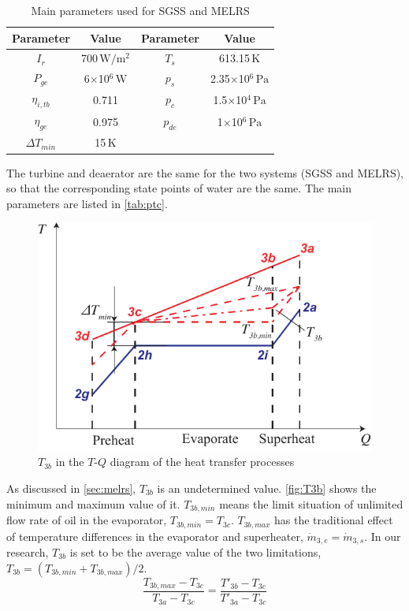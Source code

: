 \begin{table}[htbp]
	\caption{Main parameters used for SGSS and MELRS}
	\centering
	\begin{tabular}{cccc}
		\toprule
		Parameter		&	Value	&	Parameter		&	Value\\
		\midrule
		$I_r$	&	700$\,\mathrm{W/m^2}$	&	$T_s$		&	613.15$\,\mathrm{K}$\\
		$P_{ge}$	&	6$\times$10$^6\,\mathrm{W}$	&	$p_s$		&	2.35$\times$10$^6\,\mathrm{Pa}$\\
		$\eta_{i,tb}$	&	0.711	&	$p_c$		&	1.5$\times$10$^4\,\mathrm{Pa}$\\
		$\eta_{ge}$	&	0.975	&	$p_{de}$		&	1$\times$10$^6\,\mathrm{Pa}$\\
		$\Delta T_{min}$	&	15$\,\mathrm{K}$	&	&\\		
		\bottomrule
	\end{tabular}
	\label{tab:ptc}
\end{table}

The turbine and deaerator are the same for the two systems (SGSS and MELRS), so that the corresponding state points of water are the same. The main parameters are listed in \autoref{tab:ptc}.

\begin{figure}[htbp]
\centering
	\includegraphics[width = 0.7\columnwidth]{fig/T3b}
	\caption{$T_{3b}$ in the $T$-$Q$ diagram of the heat transfer processes}
	\label{fig:T3b}
\end{figure}

As discussed in \autoref{sec:melrs}, $T_{3b}$ is an undetermined value. \autoref{fig:T3b} shows the minimum and maximum value of it. $T_{3b,min}$ means the limit situation of unlimited flow rate of oil in the evaporator, $T_{3b,min} = T_{3c}$. $T_{3b,max}$ has the traditional effect of temperature differences in the evaporator and superheater, $\dot{m}_{3,e} = \dot{m}_{3,s}$. In our research, $T_{3b}$ is set to be the average value of the two limitations, $T_{3b} = (T_{3b,min} + T_{3b,max}) / 2$.
\begin{equation}
  \dfrac{T_{3b,max}-T_{3c}}{T_{3a} - T_{3c}} = \dfrac{T'_{3b} - T_{3c}}{T'_{3a} - T_{3c}}
\end{equation}


